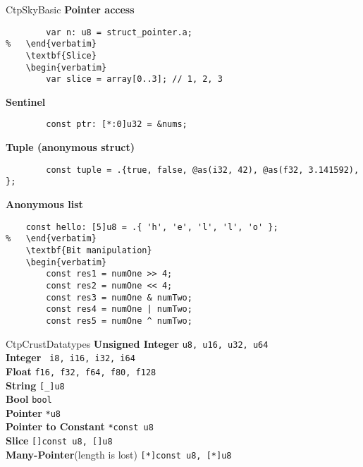 \documentclass[10pt,a4paper]{article}
\begin{document}
\begin{multicols*}{3}
\begin{mycolorbox}{CtpSky}{Basic}
	\textbf{Pointer access}
	\begin{verbatim}
		var n: u8 = struct_pointer.a;
%	\end{verbatim}
	\textbf{Slice}
	\begin{verbatim}
		var slice = array[0..3]; // 1, 2, 3
	\end{verbatim}
	\textbf{Sentinel} 
	\begin{verbatim}
		const ptr: [*:0]u32 = &nums;
	\end{verbatim}
	\textbf{Tuple (anonymous struct)}
	\begin{verbatim}
		const tuple = .{true, false, @as(i32, 42), @as(f32, 3.141592), };
	\end{verbatim}
	\textbf{Anonymous list} 
	\begin{verbatim}
	const hello: [5]u8 = .{ 'h', 'e', 'l', 'l', 'o' };
%	\end{verbatim}
	\textbf{Bit manipulation}
	\begin{verbatim}
		const res1 = numOne >> 4;
		const res2 = numOne << 4;
		const res3 = numOne & numTwo;
		const res4 = numOne | numTwo;
		const res5 = numOne ^ numTwo;
	\end{verbatim}
\end{mycolorbox}


\begin{mycolorbox}{CtpCrust}{Datatypes}
			\textbf{Unsigned Integer} \texttt{u8, u16, u32, u64}\\
			\textbf{Integer} \texttt{ i8, i16, i32, i64}\\
			\textbf{Float} \texttt{f16, f32, f64, f80, f128}\\
			\textbf{String} \texttt{[_]u8}\\
			\textbf{Bool} \texttt{bool}\\
			\textbf{Pointer} \texttt{*u8}\\
			\textbf{Pointer to Constant} \texttt{*const u8} \\
			\textbf{Slice} \texttt{[]const u8, []u8}\\
			\textbf{Many-Pointer}(length is lost) \texttt{[*]const u8, [*]u8}\\
\end{mycolorbox}


\end{multicols*}
\end{document}
